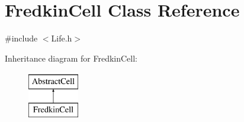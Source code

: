 \hypertarget{classFredkinCell}{\section{Fredkin\-Cell Class Reference}
\label{classFredkinCell}
}


{\ttfamily \#include $<$Life.\-h$>$}

Inheritance diagram for Fredkin\-Cell\-:\begin{figure}[H]
\begin{center}
\leavevmode
\includegraphics[height=2.000000cm]{classFredkinCell}
\end{center}
\end{figure}
